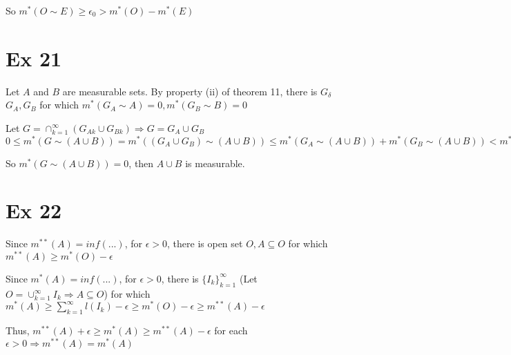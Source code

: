 \documentclass[24pt]{article}
\begin{document}
So $m^*(O \sim E) \geq \epsilon_0 > m^*(O) - m^*(E)$

\section{Ex 21}
Let $A$ and $B$ are measurable sets. By property (ii) of theorem 11, there is $G_{\delta}$ $G_A, G_B$ for which $m^*(G_A \sim A) = 0, m^*(G_B \sim B) = 0$

Let $G = \cap_{k=1}^{\infty}(G_{Ak} \cup G_{Bk}) \Rightarrow G = G_A \cup G_B$\\
$0 \leq m^*(G \sim (A \cup B)) = m^*((G_A \cup G_B) \sim (A \cup B)) \leq m^*(G_A \sim (A \cup B)) + m^*(G_B \sim (A \cup B)) < m^*(G_A \sim A) + m^*(G_B \sim B) = 0$

So $m^*(G \sim (A \cup B)) = 0$, then $A \cup B$ is measurable.

\section{Ex 22}
Since $m^{**}(A) = inf(...)$, for $\epsilon > 0$, there is open set $O, A \subseteq O$ for which $m^{**}(A) \geq m^*(O) - \epsilon$

Since $m^*(A) = inf(...)$, for $\epsilon > 0$, there is $\{I_k\}_{k=1}^{\infty}$ (Let $O = \cup^{\infty}_{k=1}I_k \Rightarrow A \subseteq O$) for which\\
$m^*(A) \geq \sum_{k=1}^{\infty}l(I_k) - \epsilon \geq m^*(O) - \epsilon \geq m^{**}(A) - \epsilon$

Thus, $m^{**}(A) + \epsilon \geq m^*(A) \geq m^{**}(A) - \epsilon$ for each $\epsilon > 0 \Rightarrow m^{**}(A) = m^*(A)$
\end{document}
